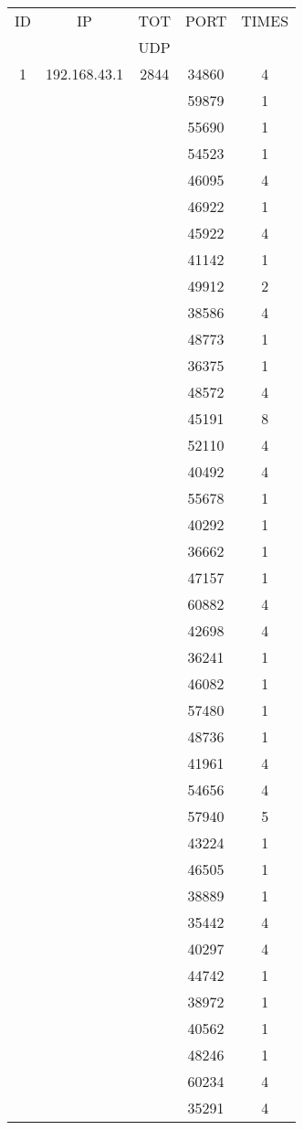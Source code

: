 \documentclass[a4paper]{scrartcl}
\begin{document}
\noindent\begin{minipage}[b]{0.5\linewidth}\begin{tabular}{| c | c | c | c | c |}
\hline
ID & IP & TOT & PORT & TIMES \\ 
   &    & UDP &      &       \\ 
\hline
1 & 192.168.43.1 & 2844 & 34860 & 4 \\ 
& & & 59879 & 1 \\ & & & 55690 & 1 \\ & & & 54523 & 1 \\ & & & 46095 & 4 \\ & & & 46922 & 1 \\ & & & 45922 & 4 \\ & & & 41142 & 1 \\ & & & 49912 & 2 \\ & & & 38586 & 4 \\ & & & 48773 & 1 \\ & & & 36375 & 1 \\ & & & 48572 & 4 \\ & & & 45191 & 8 \\ & & & 52110 & 4 \\ & & & 40492 & 4 \\ & & & 55678 & 1 \\ & & & 40292 & 1 \\ & & & 36662 & 1 \\ & & & 47157 & 1 \\ & & & 60882 & 4 \\ & & & 42698 & 4 \\ & & & 36241 & 1 \\ & & & 46082 & 1 \\ & & & 57480 & 1 \\ & & & 48736 & 1 \\ & & & 41961 & 4 \\ & & & 54656 & 4 \\ & & & 57940 & 5 \\ & & & 43224 & 1 \\ & & & 46505 & 1 \\ & & & 38889 & 1 \\ & & & 35442 & 4 \\ & & & 40297 & 4 \\ & & & 44742 & 1 \\ & & & 38972 & 1 \\ & & & 40562 & 1 \\ & & & 48246 & 1 \\ & & & 60234 & 4 \\ & & & 35291 & 4 \\ \hline\end{tabular}\end{minipage} \hfill\begin{minipage}[b]{0.5\linewidth}\begin{tabular}{| c | c | c | c | c |}

\end{tabular}
\end{minipage}
\end{document}
